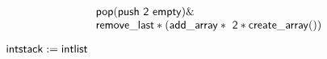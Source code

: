 \documentclass[10pt]{book}
\begin{document}
\begin{mdSnippets}
\begin{mdDisplaySnippet}[84b279b47e5dcb164ff5a309a7a32799]%
\[%
\begin{array}{l l}
{\sf pop (push\ 2 \ empty)} \&  \\
{\sf remove\_last*(add\_array*\ 2 * create\_array())}
\end{array}
\]%
\end{mdDisplaySnippet}%
\begin{mdInlineSnippet}[425f25e3b4108397f2686669fdca3d4b]%
${\sf intstack :=intlist}$\end{mdInlineSnippet}%

\end{mdSnippets}
\end{document}
